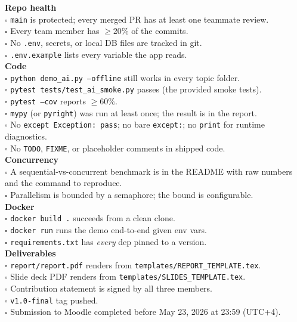 \documentclass[11pt,a4paper]{article}
\newcommand{\duedate}{May 23, 2026 at 23:59 (UTC+4)}
\begin{document}
\begin{rubricbox}
\textbf{Repo health}\\
$\square$ \texttt{main} is protected; every merged PR has at least one teammate review.\\
$\square$ Every team member has $\ge 20\%$ of the commits.\\
$\square$ No \texttt{.env}, secrets, or local DB files are tracked in git.\\
$\square$ \texttt{.env.example} lists every variable the app reads.\\

\smallskip\textbf{Code}\\
$\square$ \texttt{python demo\_ai.py --offline} still works in every topic folder.\\
$\square$ \texttt{pytest tests/test\_ai\_smoke.py} passes (the provided smoke tests).\\
$\square$ \texttt{pytest --cov} reports $\ge 60\%$.\\
$\square$ \texttt{mypy} (or \texttt{pyright}) was run at least once; the result is in the report.\\
$\square$ No \texttt{except Exception: pass}; no bare \texttt{except:}; no \texttt{print} for runtime diagnostics.\\
$\square$ No \texttt{TODO}, \texttt{FIXME}, or placeholder comments in shipped code.\\

\smallskip\textbf{Concurrency}\\
$\square$ A sequential-vs-concurrent benchmark is in the README with raw numbers and the command to reproduce.\\
$\square$ Parallelism is bounded by a semaphore; the bound is configurable.\\

\smallskip\textbf{Docker}\\
$\square$ \texttt{docker build .} succeeds from a clean clone.\\
$\square$ \texttt{docker run} runs the demo end-to-end given env vars.\\
$\square$ \texttt{requirements.txt} has \emph{every} dep pinned to a version.\\

\smallskip\textbf{Deliverables}\\
$\square$ \texttt{report/report.pdf} renders from \texttt{templates/REPORT\_TEMPLATE.tex}.\\
$\square$ Slide deck PDF renders from \texttt{templates/SLIDES\_TEMPLATE.tex}.\\
$\square$ Contribution statement is signed by all three members.\\
$\square$ \texttt{v1.0-final} tag pushed.\\
$\square$ Submission to Moodle completed before \duedate.
\end{rubricbox}
\end{document}
